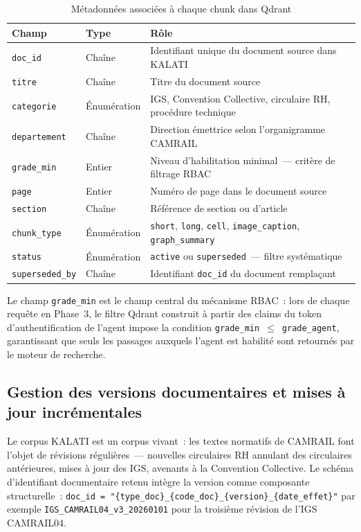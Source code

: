 \documentclass[12pt,a4paper]{report}
\begin{document}
\begin{table}[p]
\centering
\caption{Métadonnées associées à chaque chunk dans Qdrant}
\label{tab:metadata}
\renewcommand{\arraystretch}{1.4}
\begin{tabularx}{\linewidth}{@{} p{3.5cm} p{2.5cm} X @{}}
\toprule
\textbf{Champ} & \textbf{Type} & \textbf{Rôle} \\
\midrule
\texttt{doc\_id} & Chaîne & Identifiant unique du document source dans KALATI \\
\texttt{titre} & Chaîne & Titre du document source \\
\texttt{categorie} & Énumération & IGS, Convention Collective, circulaire RH, procédure technique \\
\texttt{departement} & Chaîne & Direction émettrice selon l'organigramme CAMRAIL \\
\texttt{grade\_min} & Entier & Niveau d'habilitation minimal~--- critère de filtrage RBAC \\
\texttt{page} & Entier & Numéro de page dans le document source \\
\texttt{section} & Chaîne & Référence de section ou d'article \\
\texttt{chunk\_type} & Énumération & \texttt{short}, \texttt{long}, \texttt{cell},
\texttt{image\_caption}, \texttt{graph\_summary} \\
\texttt{status} & Énumération & \texttt{active} ou \texttt{superseded}~--- filtre systématique \\
\texttt{superseded\_by} & Chaîne & Identifiant \texttt{doc\_id} du document remplaçant \\
\bottomrule
\end{tabularx}
\end{table}

Le champ \texttt{grade\_min} est le champ central du mécanisme RBAC~: lors de chaque requête en
Phase~3, le filtre Qdrant construit à partir des claims du token d'authentification de l'agent
impose la condition \texttt{grade\_min}~$\leq$~\texttt{grade\_agent}, garantissant que seuls les
passages auxquels l'agent est habilité sont retournés par le moteur de recherche.

\subsection{Gestion des versions documentaires et mises à jour incrémentales}

Le corpus KALATI est un corpus vivant~: les textes normatifs de CAMRAIL font l'objet de révisions
régulières~--- nouvelles circulaires RH annulant des circulaires antérieures, mises à jour des
IGS, avenants à la Convention Collective. Le schéma d'identifiant documentaire retenu intègre
la version comme composante structurelle~: \texttt{doc\_id = "\{type\_doc\}\_\{code\_doc\}\_\{version\}\_\{date\_effet\}"}
par exemple \texttt{IGS\_CAMRAIL04\_v3\_20260101} pour la troisième révision de l'IGS CAMRAIL04.
\end{document}

